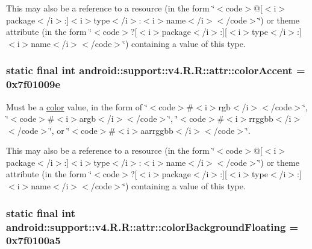 This may also be a reference to a resource (in the form \char`\"{}$<$code$>$@\mbox{[}$<$i$>$package$<$/i$>$:\mbox{]}$<$i$>$type$<$/i$>$:$<$i$>$name$<$/i$>$$<$/code$>$\char`\"{}) or theme attribute (in the form \char`\"{}$<$code$>$?\mbox{[}$<$i$>$package$<$/i$>$:\mbox{]}\mbox{[}$<$i$>$type$<$/i$>$:\mbox{]}$<$i$>$name$<$/i$>$$<$/code$>$\char`\"{}) containing a value of this type. \hypertarget{classandroid_1_1support_1_1v4_1_1_r_1_1attr_6331fd88575ac304b32a3d2bff7bc68d}{
\subsubsection[{colorAccent}]{\setlength{\rightskip}{0pt plus 5cm}static final int android::support::v4.R.R::attr::colorAccent = 0x7f01009e}}
\label{classandroid_1_1support_1_1v4_1_1_r_1_1attr_6331fd88575ac304b32a3d2bff7bc68d}


Must be a \hyperlink{classandroid_1_1support_1_1v4_1_1_r_1_1color}{color} value, in the form of \char`\"{}$<$code$>$\#$<$i$>$rgb$<$/i$>$$<$/code$>$\char`\"{}, \char`\"{}$<$code$>$\#$<$i$>$argb$<$/i$>$$<$/code$>$\char`\"{}, \char`\"{}$<$code$>$\#$<$i$>$rrggbb$<$/i$>$$<$/code$>$\char`\"{}, or \char`\"{}$<$code$>$\#$<$i$>$aarrggbb$<$/i$>$$<$/code$>$\char`\"{}. 

This may also be a reference to a resource (in the form \char`\"{}$<$code$>$@\mbox{[}$<$i$>$package$<$/i$>$:\mbox{]}$<$i$>$type$<$/i$>$:$<$i$>$name$<$/i$>$$<$/code$>$\char`\"{}) or theme attribute (in the form \char`\"{}$<$code$>$?\mbox{[}$<$i$>$package$<$/i$>$:\mbox{]}\mbox{[}$<$i$>$type$<$/i$>$:\mbox{]}$<$i$>$name$<$/i$>$$<$/code$>$\char`\"{}) containing a value of this type. \hypertarget{classandroid_1_1support_1_1v4_1_1_r_1_1attr_2977c16ce14c3cb3667fc00db2114cf4}{
\subsubsection[{colorBackgroundFloating}]{\setlength{\rightskip}{0pt plus 5cm}static final int android::support::v4.R.R::attr::colorBackgroundFloating = 0x7f0100a5}}
\label{classandroid_1_1support_1_1v4_1_1_r_1_1attr_2977c16ce14c3cb3667fc00db2114cf4}


